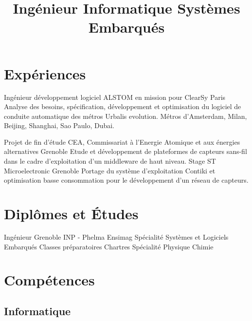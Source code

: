 \documentclass[10pt,a4paper]{moderncv}
\title{\large Ingénieur Informatique Systèmes Embarqués}
\begin{document}
\maketitle

\section{Expériences}

  {Ingénieur développement logiciel}
  {ALSTOM en mission pour ClearSy}
  {}
  {Paris}
  {Analyse des besoins, spécification, développement et optimisation du logiciel de conduite automatique des métros Urbalis evolution.\newline{} Métros d'Amsterdam, Milan, Beijing, Shanghai, Sao Paulo, Dubai.\newline{}}

  {Projet de fin d'étude}
  {CEA, Commissariat à l'Energie Atomique et aux énergies alternatives}
  {}
  {Grenoble}
  {Etude et développement de plateformes de capteurs sans-fil dans le cadre d'exploitation d'un middleware de haut niveau.\newline{}}
  {Stage}
  {ST Microelectronic}
  {}
  {Grenoble}
  {Portage du système d'exploitation Contiki et optimisation basse consommation pour le développement d'un réseau de capteurs.\newline{}}

\section{Diplômes et Études}
  {Ingénieur Grenoble INP - Phelma Ensimag}
  {}
  {}
  {}
  {Spécialité Systèmes et Logiciels Embarqués\newline{}}
  {Classes préparatoires}
  {}
  {}
  {Chartres}
  {Spécialité Physique Chimie\newline{}}

\section{Compétences}

  \subsection{Informatique}
\end{document}
